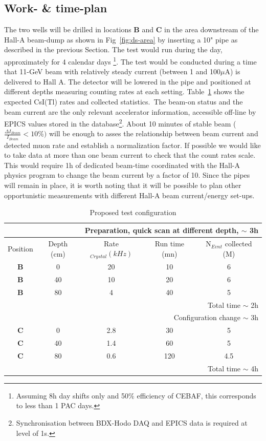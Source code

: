 \subsection{Work- \& time-plan}
The two wells  will be drilled in locations {\bf B} and {\bf C} in the area downstream of the Hall-A beam-dump as shown in Fig~\ref{fig:ds-area} by inserting a 10" pipe as described in the previous Section. The test would  
run during the day, approximately for 4 calendar days \footnote{Assuming 8h day shifts only and  50$\%$ efficiency of CEBAF, this corresponds to less than 1 PAC days.}.
The test would be conducted during a time that 11-GeV beam with relatively steady current (between 1 and 100$\mu$A) is delivered  to Hall A.
The detector will be lowered in the pipe and positioned at different depths measuring counting rates at each setting. Table~\ref{tab:test} shows the expected CsI(Tl) rates and collected statistics.\
The beam-on status and the beam current are the only 
relevant accelerator information,  accessible off-line by  EPICS values stored in the  database\footnote{Synchronisation between BDX-Hodo DAQ and EPICS data  is required  at level of 1s.}. About 10 minutes of stable beam ($\frac{\Delta I_{Beam}}{I_{Beam}}<10\%)$ will  be enough to asses the relationship between beam current and detected muon rate and establish a normalization factor. 
If possible  we would like to take data at more than one beam current to check that the count rates scale.
This  would require 1h of dedicated beam-time  coordinated with the Hall-A physics program to change the beam current by a factor of 10.
Since the pipes will remain in place, it is worth noting that it will be possible to plan other opportunistic measurements with different Hall-A beam current/energy  set-ups.
 \begin{table}[htp]
\caption{Proposed test configuration}
\begin{center}
\begin{tabular}{|c|c|c|c|c|}
\hline\hline
\multicolumn{5}{r}{Preparation, quick scan at different depth,   $\sim$ 3h } \\
\hline
Position  &Depth  (cm)& Rate$_{Crystal} (kHz)$  &Run time (mn) & N$_{Evnt}$ collected (M)  \\
\hline\hline
 {\bf B} & 0 &  20 & 10 & 6\\
 \hline
 {\bf B}  & 40 &  10 & 20 & 6 \\
 \hline
 {\bf B}  & 80 &  4 & 40 & 5\\
 \hline
\multicolumn{5}{|r|}{Total time    $\sim$ 2h }\\
 \hline\hline
\multicolumn{5}{r}{Configuration change  $\sim$ 3h } \\
 \hline\hline
 {\bf C} & 0 &  2.8 & 30 & 5\\
 \hline
 {\bf C}  & 40 &  1.4 & 60 & 5 \\
 \hline
 {\bf C}  & 80 &  0.6 & 120 &4.5\\
 \hline
\multicolumn{5}{|r|}{Total time    $\sim$ 4h }\\
 \hline\hline
\end{tabular}
\end{center}
\label{tab:test}
\end{table}

